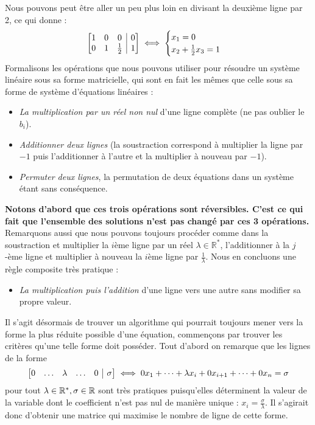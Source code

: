 Nous pouvons peut être aller un peu plus loin en divisant la deuxième ligne par 2, ce qui donne :
$$
\left[
\begin{array}{@{}ccc|c@{}}
1 & 0 & 0 & 0 \\
0 & 1 & \frac{1}{2} & 1 \\
\end{array}
\right]
\iff
\begin{cases}
x_1 = 0 \\
x_2 + \frac{1}{2}x_3 = 1
\end{cases}
$$
Formalisons les opérations que nous pouvons utiliser pour résoudre un système linéaire sous sa forme matricielle, qui sont en fait les mêmes que celle sous sa forme de système d'équations linéaires : 
\begin{itemize}
    \item \textit{La multiplication par un réel non nul} d'une ligne complète (ne pas oublier le $b_i$).
    \item \textit{Additionner deux lignes} (la soustraction correspond à multiplier la ligne par $-1$ puis l'additionner à l'autre et la multiplier à nouveau par $-1$).
    \item \textit{Permuter deux lignes}, la permutation de deux équations dans un système étant sans conséquence.
\end{itemize}
\textbf{Notons d'abord que ces trois opérations sont réversibles. C'est ce qui fait que l'ensemble des solutions n'est pas changé par ces 3 opérations.}\\

\noindent Remarquons aussi que nous pouvons toujours procéder comme dans la soustraction et multiplier la $i$ème ligne par un réel $\lambda \in \mathbb{R}^*$, l'additionner à la $j$-ème ligne et multiplier à nouveau la $i$ème ligne par $\frac{1}{\lambda}$. Nous en concluons une règle composite très pratique : 
\begin{itemize}
    \item \textit{La multiplication puis l'addition} d'une ligne vers une autre sans modifier sa propre valeur.
\end{itemize}
Il s'agit désormais de trouver un algorithme qui pourrait toujours mener vers la forme la plus réduite possible d'une équation, commençons par trouver les critères qu'une telle forme doit posséder. Tout d'abord on remarque que les lignes de la forme 
$$ 
\left[
\begin{array}{@{}ccccc|c@{}}
0 & \ldots & \lambda & \ldots & 0 & \sigma \\
\end{array}
\right]
\iff
0x_1 + \cdots + \lambda x_i + 0x_{i+1} + \cdots + 0x_n = \sigma
$$
pour tout $\lambda \in \mathbb{R}^*, \sigma \in \mathbb{R}$ sont très pratiques puisqu'elles déterminent la valeur de la variable dont le coefficient n'est pas nul de manière unique : $x_i = \frac{\sigma}{\lambda}$. Il s'agirait donc d'obtenir une matrice qui maximise le nombre de ligne de cette forme.\\

